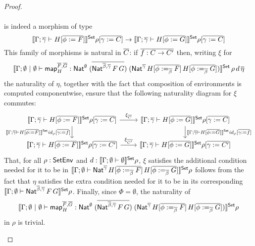 \documentclass[runningheads]{llncs}
\renewcommand{\id}{\mathit{id}}
\newcommand{\map}{\mathsf{map}}
\renewcommand{\id}{\mathit{id}}
\begin{document}
\begin{proof}
\begin{itemize}
\begin{align*}
\end{align*}
is indeed a morphism of type
$$\setsem{\Gamma ;\ol{\gamma} \vdash H[\ol{\phi := F}]}\rho[\ol{\gamma
      := C}]%
\to 
\setsem{\Gamma ;\ol{\gamma} \vdash H[\ol{\phi := G}]}\rho[\ol{\gamma
      := C}]$$
This family of morphisms is natural in $\overline{C}$: if $\overline{f : C \to C'}$
then, writing $\xi$ for
\[
\setsem{\Gamma; \emptyset~|~\emptyset \vdash \map^{\ol{F},\ol{G}}_H
    : \Nat^\emptyset\;(\ol{\Nat^{\ol{\beta},\ol{\gamma}}\,F\,G})\;
    (\Nat^{\ol{\gamma}}\,H[\ol{\phi :=_{\ol{\beta}} F}]\,H[\ol{\phi
        :=_{\ol{\beta}} G}])}\,\rho\,d\, \ol{\eta}
\]
the naturality of $\eta$,
together with the fact that composition of environments is
computed componentwise, ensure that the following naturality diagram
for $\xi$ commutes:
{\footnotesize
\[\begin{tikzcd}
\setsem{\Gamma ;\ol{\gamma} \vdash H[\ol{\phi := F}]}\rho[\ol{\gamma
      := C}] \ar[r, "{\xi_{\ol{C}}}"]
\ar[d, "{\setsem{\Gamma ;\ol{\gamma} \vdash H[\ol{\phi :=
          F}]}\id_{\rho}[\ol{\gamma := f}]}"']
& \setsem{\Gamma ; \ol{\gamma} \vdash H[\ol{\phi := G}]}\rho[\ol{\gamma
      := C}]
\ar[d, "{\setsem{\Gamma ; \ol{\gamma} \vdash H[\ol{\phi :=
          G}]}\id_{\rho}[\ol{\gamma := f}]}"]\\
\setsem{\Gamma ;\ol{\gamma} \vdash H[\ol{\phi := F}]}\rho[\ol{\gamma
      := C'}] \ar[r, "{\xi_{\ol{C'}}}"]
& \setsem{\Gamma ; \ol{\gamma} \vdash H[\ol{\phi := G}]}\rho[\ol{\gamma
      := C'}] 
\end{tikzcd}\]}
That, for all $\rho : \mathsf{SetEnv}$ and $d : \llbracket{\Gamma; \emptyset \vdash
  \emptyset}\rrbracket^{\mathsf{Set}}\rho$, $\xi$ satisfies the additional condition needed for
it to be in $\llbracket{\Gamma; \emptyset \vdash
  \mathsf{Nat}^{\overline{\gamma}}\,H[\overline{\phi :=_{\overline{\beta}} F}]\,H[\overline{\phi
      :=_{\overline{\beta}} G}]}\rrbracket^{\mathsf{Set}}\rho$ follows from the fact
that $\eta$ satisfies the extra
condition needed for it to be in its corresponding
$\llbracket{\Gamma; \emptyset \vdash \mathsf{Nat}^{\overline{\beta},\overline{\gamma}}\,F\,G}\rrbracket^{\mathsf{Set}} \rho$.
Finally, since $\Phi = \emptyset$, the naturality of
\[
\setsem{\Gamma; \emptyset~|~\emptyset \vdash \map^{\ol{F},\ol{G}}_H
    : \Nat^\emptyset\;(\ol{\Nat^{\ol{\beta},\ol{\gamma}}\,F\,G})\;
    (\Nat^{\ol{\gamma}}\,H[\ol{\phi :=_{\ol{\beta}} F}]\,H[\ol{\phi
        :=_{\ol{\beta}} G}])}\rho
\]
in $\rho$ is trivial.



\end{itemize}
\end{proof}
\end{document}
